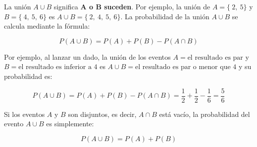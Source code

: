 La unión $A \cup B$ significa \textbf{A o B suceden}. Por ejemplo, la unión de
$A=\{~2,~5\}$ y $B=\{~4,~5,~6\}$ es $A \cup B=\{~2,~4,~5,~6\}$. La probabilidad de 
la unión $A \cup B$ se calcula mediante la fórmula:
	
	$$P(A \cup B) = P(A)+P(B) - P(A \cap B)$$
	
Por ejemplo, al lanzar un dado, la unión de los eventos $A=\text{el resultado es par}$ y $B=\text{el resultado es inferior a 4}$ es $A \cup B=\text{el resultado es par o menor que 4}$   y su probabilidad es:

 $$P(A \cup B) = P(A)+P(B) - P(A \cap B) = \dfrac{1}{2} + \dfrac{1}{2} - \dfrac{1}{6} = \dfrac{5}{6}$$
 
Si los eventos $A$ y $B$ son disjuntos, es decir, $A \cap B$ está vacío, la probabilidad del evento $A \cup B$ es simplemente:

$$P(A \cup B) = P(A)+P(B)$$